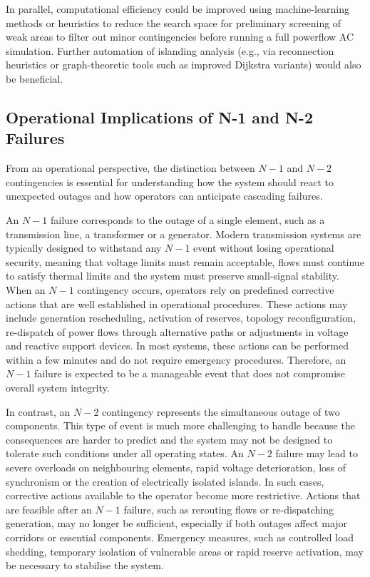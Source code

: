 \documentclass[journal]{IEEEtran}
\begin{document}
In parallel, computational efficiency could be improved using machine-learning methods or heuristics to reduce the search space for preliminary screening of weak areas to filter out minor contingencies before running a full powerflow AC simulation. Further automation of islanding analysis (e.g., via reconnection heuristics or graph-theoretic tools such as improved Dijkstra variants) would also be beneficial.

\subsection{Operational Implications of N-1 and N-2 Failures}

From an operational perspective, the distinction between $N-1$ and $N-2$ contingencies is essential for understanding how the system should react to unexpected outages and how operators can anticipate cascading failures.

An $N-1$ failure corresponds to the outage of a single element, such as a transmission line, a transformer or a generator. Modern transmission systems are typically designed to withstand any $N-1$ event without losing operational security, meaning that voltage limits must remain acceptable, flows must continue to satisfy thermal limits and the system must preserve small-signal stability. When an $N-1$ contingency occurs, operators rely on predefined corrective actions that are well established in operational procedures. These actions may include generation rescheduling, activation of reserves, topology reconfiguration, re-dispatch of power flows through alternative paths or adjustments in voltage and reactive support devices. In most systems, these actions can be performed within a few minutes and do not require emergency procedures. Therefore, an $N-1$ failure is expected to be a manageable event that does not compromise overall system integrity.

In contrast, an $N-2$ contingency represents the simultaneous outage of two components. This type of event is much more challenging to handle because the consequences are harder to predict and the system may not be designed to tolerate such conditions under all operating states. An $N-2$ failure may lead to severe overloads on neighbouring elements, rapid voltage deterioration, loss of synchronism or the creation of electrically isolated islands. In such cases, corrective actions available to the operator become more restrictive. Actions that are feasible after an $N-1$ failure, such as rerouting flows or re-dispatching generation, may no longer be sufficient, especially if both outages affect major corridors or essential components. Emergency measures, such as controlled load shedding, temporary isolation of vulnerable areas or rapid reserve activation, may be necessary to stabilise the system.
\end{document}
